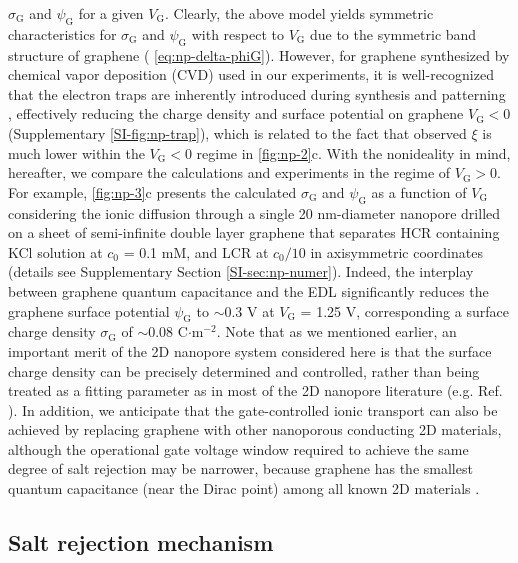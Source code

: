 $\sigma_{\mathrm{G}}$ and $\psi_{\mathrm{G}}$ for a given
$V_{\mathrm{G}}$. Clearly, the above model yields symmetric
characteristics for $\sigma_{\mathrm{G}}$ and $\psi_{\mathrm{G}}$ with
respect to $V_{\mathrm{G}}$ due to the symmetric band structure of
graphene ( \autoref{eq:np-delta-phiG}). However, for graphene
synthesized by chemical vapor deposition (CVD) used in our
experiments, it is well-recognized that the electron traps are
inherently introduced during synthesis and patterning
\cite{Dean_2010_BN_gr_highquality}, effectively reducing the charge density and surface
potential on graphene $V_{\mathrm{G}}<0$ (Supplementary 
\autoref{SI-fig:np-trap}), which is related to the fact that observed $\xi$
is much lower within the $V_{\mathrm{G}}<0$ regime in 
\autoref{fig:np-2}c. With the nonideality in mind, hereafter, we compare the
calculations and experiments in the regime of $V_{\mathrm{G}}>0$. For
example,  \autoref{fig:np-3}c presents the calculated
$\sigma_{\mathrm{G}}$ and $\psi_{\mathrm{G}}$ as a function of
$V_{\mathrm{G}}$ considering the ionic diffusion through a single 20
nm-diameter nanopore drilled on a sheet of semi-infinite double layer
graphene that separates HCR containing KCl solution at $c_{0}$ = 0.1
mM, and LCR at $c_{0}/10$ in axisymmetric coordinates (details see
Supplementary Section \autoref{SI-sec:np-numer}). Indeed, the interplay
between graphene quantum capacitance and the EDL significantly reduces
the graphene surface potential $\psi_{\mathrm{G}}$ to $\sim$0.3 V at
$V_{\mathrm{G}}$ = 1.25 V, corresponding a surface charge density
$\sigma_{\mathrm{G}}$ of $\sim$0.08 C$\cdot$m$^{-2}$. Note that as we
mentioned earlier, an important merit of the 2D nanopore system
considered here is that the surface charge density can be precisely
determined and controlled, rather than being treated as a fitting
parameter as in most of the 2D nanopore literature
(e.g. Ref. \cite{Rollings_2016_gating}). In addition, we anticipate that
the gate-controlled ionic transport can also be achieved by replacing
graphene with other nanoporous conducting 2D materials, although the
operational gate voltage window required to achieve the same degree of
salt rejection may be narrower, because graphene has the smallest
quantum capacitance (near the Dirac point) among all known 2D
materials .

\subsection{Salt rejection mechanism}
\label{sec:np-mechanism}

